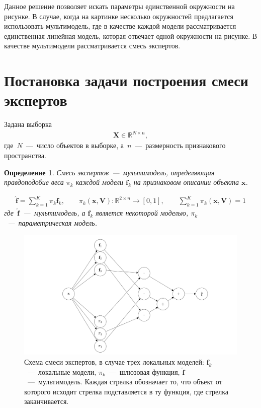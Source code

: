 \documentclass[12pt, twoside]{article}
\newtheorem{definition}{Определение}[section]
\numberwithin{equation}{section}
\begin{document}
Данное решение позволяет искать параметры единственной окружности на рисунке. В случае, когда на картинке несколько окружностей предлагается использовать мультимодель, где в качестве каждой модели рассматривается единственная линейная модель, которая отвечает одной окружности на рисунке. В качестве мультимодели рассматривается смесь экспертов.

\section{Постановка задачи построения смеси экспертов}

Задана выборка
\begin{equation}
\label{eq:st:1}
\begin{aligned}
\textbf{X} \in \mathbb{R}^{N \times n},
\end{aligned}
\end{equation}
где~$N$~---~число объектов в выборке, а~$n$~---~размерность признакового пространства.

\begin{definition}
Смесь экспертов~---~мультимодель, определяющая правдоподобие веса $\pi_k$ каждой модели $\textbf{f}_k$ на признаковом описании объекта $\textbf{x}$.

\begin{equation}
\label{eq:st:2}
\begin{aligned}
\hat{\mathbf{f}} = \sum_{k=1}^{K}\pi_{k}\mathbf{f}_k, \qquad \pi_{k}\left(\textbf{x}, \textbf{V}\right):\mathbb{R}^{2\times n} \to [0, 1], \qquad \sum_{k=1}^{K}\pi_{k}\left(\textbf{x}, \textbf{V}\right) = 1
\end{aligned}
\end{equation}
где~$\hat{\mathbf{f}}$~---~мультимодель, а $\mathbf{f}_k$ является некоторой моделью, $\pi_k$~---~параметрическая модель.
\end{definition}

\begin{figure}[h!t]\center
\includegraphics[width=1\textwidth]{results/scheme}
\caption{Схема смеси экспертов, в случае трех локальных моделей: $\textbf{f}_k$~---~локальные модели, $\pi_k$~---~шлюзовая функция, $\hat{\mathbf{f}}$~---~мультимодель. Каждая стрелка обозначает то, что объект от которого исходит стрелка подставляется в ту функция, где стрелка заканчивается.}
\label{scheme:1}
\end{figure}
\end{document}
